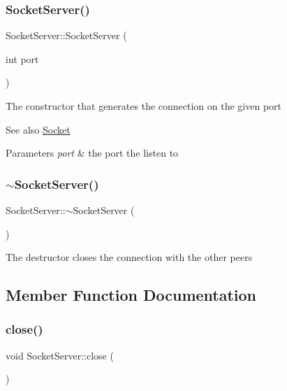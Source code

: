 \subsubsection{\texorpdfstring{Socket\+Server()}{SocketServer()}}
{\footnotesize\ttfamily Socket\+Server\+::\+Socket\+Server (\begin{DoxyParamCaption}\item[{int}]{port }\end{DoxyParamCaption})\hspace{0.3cm}{\ttfamily [explicit]}}

The constructor that generates the connection on the given port \begin{DoxySeeAlso}{See also}
\mbox{\hyperlink{classSocket}{Socket}}
\end{DoxySeeAlso}

\begin{DoxyParams}{Parameters}
{\em port} & the port the listen to \\
\hline
\end{DoxyParams}
\mbox{\label{classSocketServer_af0e595690e453ef4b8e8da174069aba9}} 
\subsubsection{\texorpdfstring{$\sim$\+Socket\+Server()}{~SocketServer()}}
{\footnotesize\ttfamily Socket\+Server\+::$\sim$\+Socket\+Server (\begin{DoxyParamCaption}{ }\end{DoxyParamCaption})\hspace{0.3cm}{\ttfamily [virtual]}}

The destructor closes the connection with the other peers 

\subsection{Member Function Documentation}
\mbox{\label{classSocketServer_a1e673e526a459bdb3ca92e103ec212ae}} 
\subsubsection{\texorpdfstring{close()}{close()}}
{\footnotesize\ttfamily void Socket\+Server\+::close (\begin{DoxyParamCaption}{ }\end{DoxyParamCaption})}

